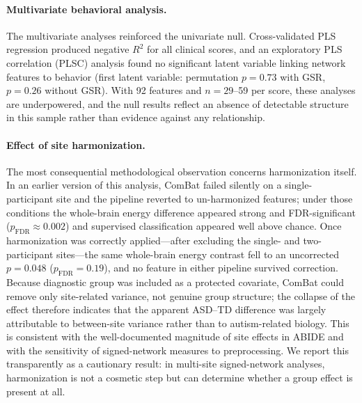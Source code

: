 \documentclass[10pt,letterpaper]{article}
\begin{document}
\paragraph*{Multivariate behavioral analysis.}
The multivariate analyses reinforced the univariate null. Cross-validated PLS regression produced
negative $R^2$ for all clinical scores, and an exploratory PLS correlation (PLSC) analysis found no
significant latent variable linking network features to behavior (first latent variable: permutation
$p = 0.73$ with GSR, $p = 0.26$ without GSR). With 92 features and $n = 29$--59 per score, these
analyses are underpowered, and the null results reflect an absence of detectable structure in this
sample rather than evidence against any relationship.

\paragraph*{Effect of site harmonization.}
The most consequential methodological observation concerns harmonization itself. In an earlier
version of this analysis, ComBat failed silently on a single-participant site and the pipeline
reverted to un-harmonized features; under those conditions the whole-brain energy difference appeared
strong and FDR-significant ($p_{\mathrm{FDR}} \approx 0.002$) and supervised classification appeared
well above chance. Once harmonization was correctly applied---after excluding the single- and
two-participant sites---the same whole-brain energy contrast fell to an uncorrected $p = 0.048$
($p_{\mathrm{FDR}} = 0.19$), and no feature in either pipeline survived correction. Because diagnostic
group was included as a protected covariate, ComBat could remove only site-related variance, not
genuine group structure; the collapse of the effect therefore indicates that the apparent ASD--TD
difference was largely attributable to between-site variance rather than to autism-related biology.
This is consistent with the well-documented magnitude of site effects in ABIDE and with the
sensitivity of signed-network measures to preprocessing. We report this transparently as a cautionary
result: in multi-site signed-network analyses, harmonization is not a cosmetic step but can determine
whether a group effect is present at all.
\end{document}
